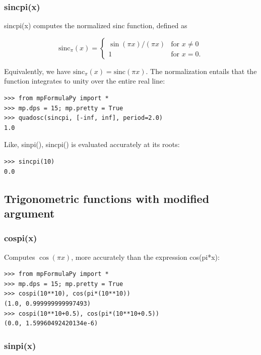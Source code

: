 \subsubsection{sincpi(x)}
sincpi(x) computes the normalized sinc function, defined as

\begin{equation}
	\text{sinc}_{\pi}(x)=\begin{cases}
		\sin(\pi x)/(\pi x) & \text{for }x \ne 0\\
		1 & \text{for }x=0.
	\end{cases}
\end{equation}



Equivalently, we have  $\text{sinc}_{\pi}(x)=\text{sinc}(\pi x)$.
The normalization entails that the function integrates to unity over the entire real line:

\begin{lstlisting}
>>> from mpFormulaPy import *
>>> mp.dps = 15; mp.pretty = True
>>> quadosc(sincpi, [-inf, inf], period=2.0)
1.0
\end{lstlisting}

Like, sinpi(), sincpi() is evaluated accurately at its roots:

\begin{lstlisting}
>>> sincpi(10)
0.0
\end{lstlisting}




\subsection{Trigonometric functions with modified argument}
\subsubsection{cospi(x)}

Computes $\cos(\pi x)$, more accurately than the expression cos(pi*x):

\begin{lstlisting}
>>> from mpFormulaPy import *
>>> mp.dps = 15; mp.pretty = True
>>> cospi(10**10), cos(pi*(10**10))
(1.0, 0.999999999997493)
>>> cospi(10**10+0.5), cos(pi*(10**10+0.5))
(0.0, 1.59960492420134e-6)
\end{lstlisting}

\subsubsection{sinpi(x)}

